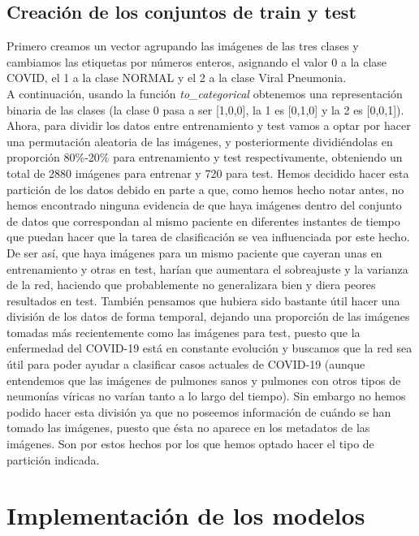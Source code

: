 \documentclass[11pt,a4paper]{article}
\theoremstyle{definition}
\begin{document}
\subsection{Creación de los conjuntos de train y test}

Primero creamos un vector agrupando las imágenes de las tres clases y cambiamos las etiquetas por números enteros, asignando el valor 0 a la clase COVID, el 1 a la clase NORMAL y el 2 a la clase Viral Pneumonia.\\

A continuación, usando la función \textit{to\_categorical} obtenemos una representación binaria de las clases (la clase 0 pasa a ser [1,0,0], la 1 es [0,1,0] y la 2 es [0,0,1]).\\

Ahora, para dividir los datos entre entrenamiento y test vamos a optar por hacer una permutación aleatoria de las imágenes, y posteriormente dividiéndolas en proporción 80\%-20\% para entrenamiento y test respectivamente, obteniendo un total de 2880 imágenes para entrenar y 720 para test. Hemos decidido hacer esta partición de los datos debido en parte a que, como hemos hecho notar antes, no hemos encontrado ninguna evidencia de que haya imágenes dentro del conjunto de datos que correspondan al mismo paciente en diferentes instantes de tiempo que puedan hacer que la tarea de clasificación se vea influenciada por este hecho. De ser así, que haya imágenes para un mismo paciente que cayeran unas en entrenamiento y otras en test, harían que aumentara el sobreajuste y la varianza de la red, haciendo que probablemente no generalizara bien y diera peores resultados en test. También pensamos que hubiera sido bastante útil hacer una división de los datos de forma temporal, dejando una proporción de las imágenes tomadas más recientemente como las imágenes para test, puesto que la enfermedad del COVID-19 está en constante evolución y buscamos que la red sea útil para poder ayudar a clasificar casos actuales de COVID-19 (aunque entendemos que las imágenes de pulmones sanos y pulmones con otros tipos de neumonías víricas no varían tanto a lo largo del tiempo). Sin embargo no hemos podido hacer esta división ya que no poseemos información de cuándo se han tomado las imágenes, puesto que ésta no aparece en los metadatos de las imágenes. Son por estos hechos por los que hemos optado hacer el tipo de partición indicada.

\section{Implementación de los modelos}
\end{document}
